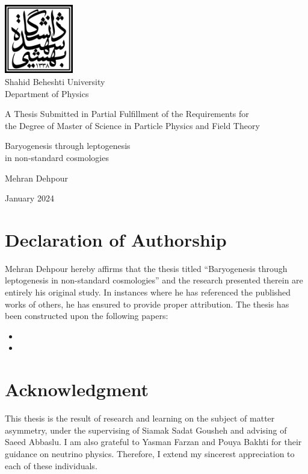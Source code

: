 \documentclass[a4paper]{book}
\author{}
\title{}
\date{}
\begin{document}
	
	
	\begin{titlepage}
		\thispagestyle{empty}
		\centering
		{\includegraphics[height=3cm]{./logo}\\Shahid Beheshti University\\Department of Physics \par}
		\vspace{1cm}
		{A Thesis Submitted in Partial Fulfillment of the Requirements for\\the Degree of Master of Science in Particle Physics and Field Theory \par}
		\vspace{1cm}
		{\huge Baryogenesis through leptogenesis \\in non-standard cosmologies \par}
		\vspace{1cm}
		{\large Mehran Dehpour\par}
		\vfill
		{\large January 2024\par}
	\end{titlepage}
	\restoregeometry
	
	\chapter*{Declaration of Authorship}
	Mehran Dehpour hereby affirms that the thesis titled ``Baryogenesis through leptogenesis in non-standard cosmologies'' and the research presented therein are entirely his original study. In instances where he has referenced the published works of others, he has ensured to provide proper attribution. 
	The thesis has been constructed upon the following papers:
	\noindent
	\begin{itemize}
		\item {}
		\item {}
	\end{itemize}
	
	\chapter*{Acknowledgment}
	This thesis is the result of research and learning on the subject of matter asymmetry, under the supervising of Siamak Sadat Gousheh and advising of Saeed Abbaslu. I am also grateful to Yasman Farzan and Pouya Bakhti for their guidance on neutrino physics. Therefore, I extend my sincerest appreciation to each of these individuals.
	
\end{document}
